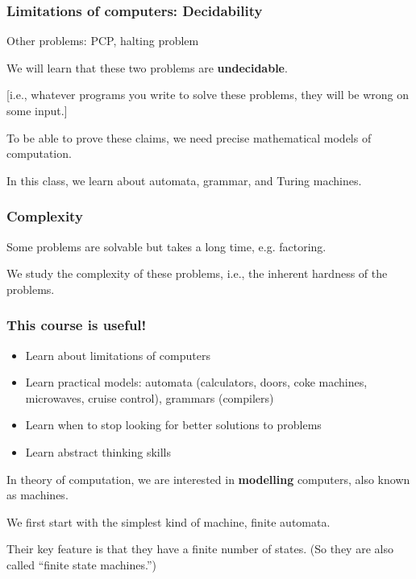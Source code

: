 \documentclass[xcolor=table]{beamer}
\begin{document}
\begin{frame}
  \frametitle{Limitations of computers: Decidability}

  \bigskip

  Other problems: PCP, halting problem

  \bigskip
  We will learn that these two problems are \alert{\textbf{undecidable}}.

  [i.e., whatever programs you write to solve these problems, they will
  be wrong on some input.]


  \bigskip
  \bigskip
  To be able to \alert{prove} these claims, we need precise
  \alert{mathematical models of computation}.

  \medskip
  In this class, we learn about \alert{automata}, \alert{grammar},
  and \alert{Turing machines}.

\end{frame}

\begin{frame}

  \frametitle{Complexity}

  Some problems are solvable but takes a long time, e.g. factoring.

  \bigskip
  We study the \alert{complexity} of these problems, i.e., the
  inherent hardness of the problems.
\end{frame}

\begin{frame}
  \frametitle{This course is useful!}

  \begin{itemize}
    \item Learn about limitations of computers
    \item Learn practical models: automata (calculators, doors,
    coke machines, microwaves, cruise control), grammars (compilers)
    \item Learn when to stop looking for better solutions to problems
    \item Learn \alert{abstract thinking} skills
  \end{itemize}
\end{frame}


\begin{frame}

In theory of computation, we are interested in \textbf{modelling}
computers, also known as \alert{machines}.

\bigskip
We first start with the simplest kind of machine,
\alert{finite automata}.

\bigskip
Their key feature is that they have a finite number of states. (So
they are also called ``finite state machines.'')
\end{frame}
\end{document}
